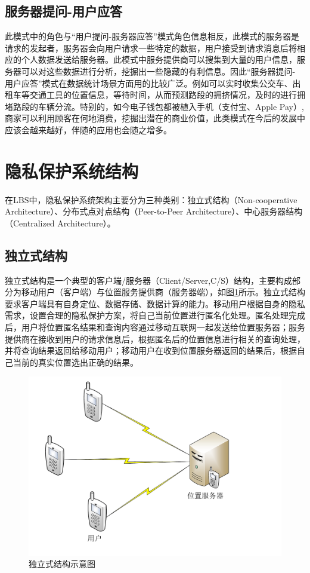 \subsection{服务器提问-用户应答}
此模式中的角色与“用户提问-服务器应答”模式角色信息相反，此模式的服务器是请求的发起者，服务器会向用户请求一些特定的数据，用户接受到请求消息后将相应的个人数据发送给服务器。此模式中服务提供商可以搜集到大量的用户信息，服务器可以对这些数据进行分析，挖掘出一些隐藏的有利信息。因此“服务器提问- 用户应答”模式在数据统计场景方面用的比较广泛。例如可以实时收集公交车、出租车等交通工具的位置信息，等待时间，从而预测路段的拥挤情况，及时的进行拥堵路段的车辆分流。特别的，如今电子钱包都被植入手机（支付宝、Apple Pay）,商家可以利用顾客在何地消费，挖掘出潜在的商业价值，此类模式在今后的发展中应该会越来越好，伴随的应用也会随之增多。
\section{隐私保护系统结构}
在LBS中，隐私保护系统架构主要分为三种类别：独立式结构（Non-cooperative Architecture）、分布式点对点结构（Peer-to-Peer Architecture）、中心服务器结构（Centralized Architecture）\cite{WuYinJie}。
\subsection{独立式结构}
独立式结构\cite{ChengR}是一个典型的客户端/服务器（Client/Server,C/S）结构，主要构成部分为移动用户（客户端）与位置服务提供商（服务器端），如图\ref{fig:independentConstruction_pdf}所示。独立式结构要求客户端具有自身定位、数据存储、数据计算的能力。移动用户根据自身的隐私需求，设置合理的隐私保护方案，将自己当前位置进行匿名化处理。匿名处理完成后，用户将位置匿名结果和查询内容通过移动互联网一起发送给位置服务器；服务提供商在接收到用户的请求信息后，根据匿名后的位置信息进行相关的查询处理，并将查询结果返回给移动用户；移动用户在收到位置服务器返回的结果后，根据自己当前的真实位置选出正确的结果。


\begin{figure}[H]
\centering
\includegraphics[width=12cm]{fig/independentConstruction.pdf}
\caption{独立式结构示意图} %
\label{fig:independentConstruction_pdf}
\end{figure}

